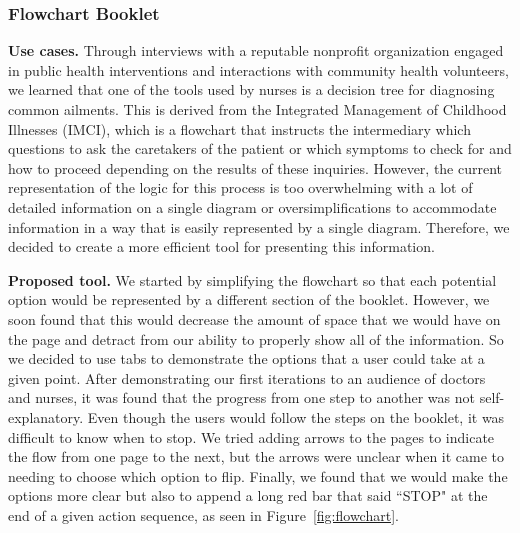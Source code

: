 \documentclass{sig-alternate}
\begin{document}

\subsubsection{Flowchart Booklet}
\label{sec:flowchart}

\textbf{Use cases.}
Through interviews with a reputable nonprofit organization engaged in public health interventions and interactions with community health volunteers, we learned that one of the tools used by nurses is a decision tree for diagnosing common ailments. This is derived from the Integrated Management of Childhood Illnesses (IMCI), which is a flowchart that instructs the intermediary which questions to ask the caretakers of the patient or which symptoms to check for and how to proceed depending on the results of these inquiries. However, the current representation of the logic for this process is too overwhelming with a lot of detailed information on a single diagram or oversimplifications to accommodate information in a way that is easily represented by a single diagram. Therefore, we decided to create a more efficient tool for presenting this information.

\textbf{Proposed tool.}
We started by simplifying the flowchart so that each potential option would be represented by a different section of the booklet. However, we soon found that this would decrease the amount of space that we would have on the page and detract from our ability to properly show all of the information. So we decided to use tabs to demonstrate the options that a user could take at a given point. After demonstrating our first iterations to an audience of doctors and nurses, it was found that the progress from one step to another was not self-explanatory. Even though the users would follow the steps on the booklet, it was difficult to know when to stop. We tried adding arrows to the pages to indicate the flow from one page to the next, but the arrows were unclear when it came to needing to choose which option to flip. Finally, we found that we would make the options more clear but also to append a long red bar that said ``STOP" at the end of a given action sequence, as seen in Figure~\ref{fig:flowchart}.
\end{document}
